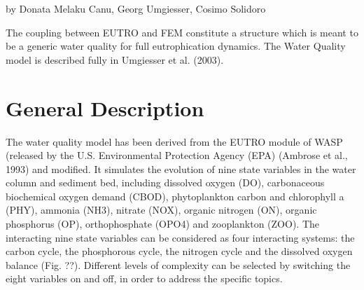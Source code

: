 %
                                                                              
                                                                                                    
                                                                                                    
                                                                                                    
                                                                                                    
                                                                                                    
                                                                                                    
                                                                                                    
                                                                                                    
                                                                                                    
\newcommand{\tab}{\hspace{5mm}}

\newcommand{\Tone}{\ref{MassBalance}}
\newcommand{\Ttwoa}{\ref{FuncDesc}}
\newcommand{\Ttwob}{\ref{Paras}}
\newcommand{\Ttwoc}{\ref{Vars}}

\newcommand{\STone}{\ref{SMassBalance}}
\newcommand{\STtwoa}{\ref{SFuncDesc}}
\newcommand{\STtwob}{\ref{SParas}}
\newcommand{\STtwoc}{\ref{SVars}}




by Donata Melaku Canu, Georg Umgiesser, Cosimo Solidoro

\vspace{1cm}

The coupling between EUTRO and FEM constitute a structure which 
is meant to be a generic water quality for full eutrophication 
dynamics.
The Water Quality model is described fully in
Umgiesser et al. (2003).



\section{General Description}



The water quality model has been derived from the EUTRO module 
of WASP (released by the U.S. Environmental Protection Agency 
(EPA) (Ambrose et al., 1993) and modified. It simulates the evolution 
of nine state variables in the water column and sediment bed, 
including dissolved oxygen (DO), carbonaceous biochemical oxygen 
demand (CBOD), phytoplankton carbon and chlorophyll a (PHY), 
ammonia (NH3), nitrate (NOX), organic nitrogen (ON), organic 
phosphorus (OP), orthophosphate (OPO4) and zooplankton (ZOO). 
The interacting nine state variables can be considered as four 
interacting systems: the carbon cycle, the phosphorous cycle, 
the nitrogen cycle and the dissolved oxygen balance (Fig. ??). 
Different levels of complexity can be selected by switching the 
eight variables on and off, in order to address the specific 
topics.

